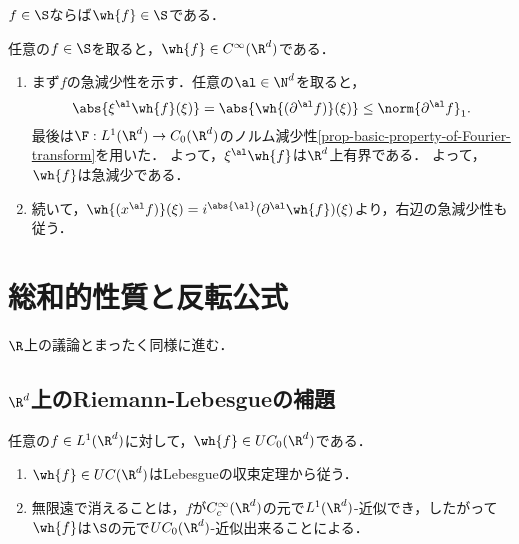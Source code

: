 \documentclass[uplatex,dvipdfmx]{jsreport}
\begin{document}
\begin{theorem}
    $f\in\S$ならば$\wh{f}\in\S$である．
\end{theorem}
\begin{Proof}
    任意の$f\in\S$を取ると，$\wh{f}\in C^\infty(\R^d)$である．
    \begin{enumerate}
        \item まず$f$の急減少性を示す．任意の$\al\in\N^d$を取ると，
        \[\abs{\xi^\al\wh{f}(\xi)}=\abs{\wh{(\partial^\al f)}(\xi)}\le\norm{\partial^\al f}_1.\]
        最後は$\F:L^1(\R^d)\to C_0(\R^d)$のノルム減少性\ref{prop-basic-property-of-Fourier-transform}を用いた．
        よって，$\xi^\al\wh{f}$は$\R^d$上有界である．
        よって，$\wh{f}$は急減少である．
        \item 続いて，$\wh{(x^\al f)}(\xi)=i^{\abs{\al}}(\partial^\al\wh{f})(\xi)$より，右辺の急減少性も従う．
    \end{enumerate}
\end{Proof}

\section{総和的性質と反転公式}

\begin{tcolorbox}[colframe=ForestGreen, colback=ForestGreen!10!white,breakable,colbacktitle=ForestGreen!40!white,coltitle=black,fonttitle=\bfseries\sffamily,
title=]
    $\R$上の議論とまったく同様に進む．
\end{tcolorbox}

\subsection{$\R^d$上のRiemann-Lebesgueの補題}

\begin{proposition}\label{cor-Riemann-Lebesgue-Rd}
    任意の$f\in L^1(\R^d)$に対して，$\wh{f}\in UC_0(\R^d)$である．
\end{proposition}
\begin{Proof}\mbox{}
    \begin{enumerate}
        \item $\wh{f}\in UC(\R^d)$はLebesgueの収束定理から従う．
        \item 無限遠で消えることは，$f$が$C_c^\infty(\R^d)$の元で$L^1(\R^d)$-近似でき，したがって$\wh{f}$は$\S$の元で$UC_0(\R^d)$-近似出来ることによる．
    \end{enumerate}
\end{Proof}
\end{document}
